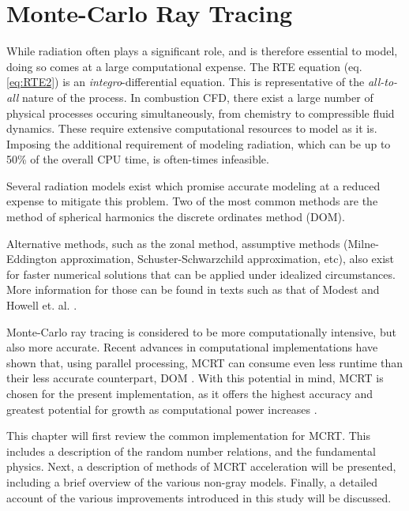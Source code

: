 \addchapheadtotoc
\chapter{Monte-Carlo Ray Tracing}\label{chapter:Modeling}
While radiation often plays a significant role, and is therefore essential to model, doing so comes at a large computational expense. 
The RTE equation (eq. \ref{eq:RTE2}) is an \textit{integro}-differential equation. This is representative of the \textit{all-to-all} nature of the process. In combustion CFD, there exist a large number of physical processes occuring simultaneously, from chemistry to compressible fluid dynamics. 
These require extensive computational resources to model as it is. Imposing the additional requirement of modeling radiation, which can be up to 50\% of the overall CPU time, is often-times infeasible.

Several radiation models exist which promise accurate modeling at a reduced expense to mitigate this problem. Two of the most common methods are the method of spherical harmonics the discrete ordinates method (DOM).

Alternative methods, such as the zonal method, assumptive methods (Milne-Eddington approximation, Schuster-Schwarzchild approximation, etc), also exist for faster numerical solutions that can be applied under idealized circumstances.
More information for those can be found in texts such as that of Modest \cite{Modest2013RadiativeTransfer} and Howell et. al. \cite{Howell2010ThermalTransfer}.

Monte-Carlo ray tracing is considered to be more computationally intensive, but also more accurate.
Recent advances in computational implementations have shown that, using parallel processing, MCRT can consume even less runtime than their less accurate counterpart, DOM \cite{Humphrey2016RadiativeRefinement}.
With this potential in mind, MCRT is chosen for the present implementation, as it offers the highest accuracy and greatest potential for growth as computational power increases \cite{Liu2020TheFlames,Howell2010ThermalTransfer}.

This chapter will first review the common implementation for MCRT. This includes a description of the random number relations, and the fundamental physics.
Next, a description of methods of MCRT acceleration will be presented, including a brief overview of the various non-gray models.
Finally, a detailed account of the various improvements introduced in this study will be discussed.

